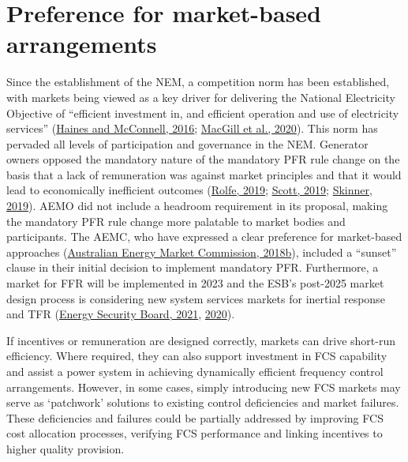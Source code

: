 \documentclass[12pt,a4paper,]{report}
\begin{document}
\hypertarget{preference-for-market-based-arrangements}{%
\section{Preference for market-based
arrangements}\label{preference-for-market-based-arrangements}}

Since the establishment of the NEM, a competition norm has been
established, with markets being viewed as a key driver for delivering
the National Electricity Objective of ``efficient investment in, and
efficient operation and use of electricity services''
(\protect\hyperlink{ref-hainesEnvironmentalNormsElectricity2016}{Haines
and McConnell, 2016};
\protect\hyperlink{ref-macgillElectricityMarketNorms2020}{MacGill et
al., 2020}). This norm has pervaded all levels of participation and
governance in the NEM. Generator owners opposed the mandatory nature of
the mandatory PFR rule change on the basis that a lack of remuneration
was against market principles and that it would lead to economically
inefficient outcomes
(\protect\hyperlink{ref-rolfeMandatoryPrimaryFrequency2019}{Rolfe,
2019}; \protect\hyperlink{ref-scottMandatoryPrimaryFrequency2019}{Scott,
2019};
\protect\hyperlink{ref-skinnerMandatoryPrimaryFrequency2019}{Skinner,
2019}). AEMO did not include a headroom requirement in its proposal,
making the mandatory PFR rule change more palatable to market bodies and
participants. The AEMC, who have expressed a clear preference for
market-based approaches
(\protect\hyperlink{ref-australianenergymarketcommissionFrequencyControlFrameworks2018}{Australian
Energy Market Commission, 2018b}), included a ``sunset'' clause in their
initial decision to implement mandatory PFR. Furthermore, a market for
FFR will be implemented in 2023 and the ESB's post-2025 market design
process is considering new system services markets for inertial response
and TFR
(\protect\hyperlink{ref-energysecurityboardPost2025Market2021}{Energy
Security Board, 2021},
\protect\hyperlink{ref-energysecurityboardPost2025Market2020}{2020}).

If incentives or remuneration are designed correctly, markets can drive
short-run efficiency. Where required, they can also support investment
in FCS capability and assist a power system in achieving dynamically
efficient frequency control arrangements. However, in some cases, simply
introducing new FCS markets may serve as `patchwork' solutions to
existing control deficiencies and market failures. These deficiencies
and failures could be partially addressed by improving FCS cost
allocation processes, verifying FCS performance and linking incentives
to higher quality provision.
\end{document}
